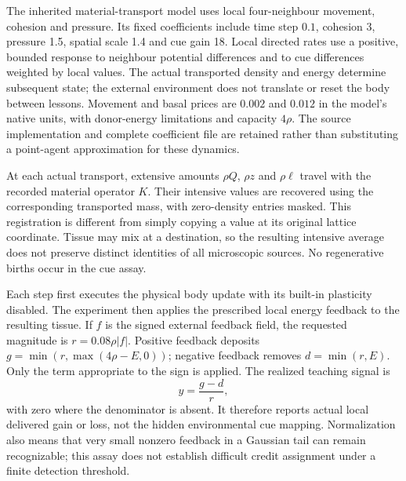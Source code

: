 The inherited material-transport model uses local four-neighbour movement, cohesion and pressure. Its fixed coefficients include time step $0.1$, cohesion 3, pressure 1.5, spatial scale 1.4 and cue gain 18. Local directed rates use a positive, bounded response to neighbour potential differences and to cue differences weighted by local values. The actual transported density and energy determine subsequent state; the external environment does not translate or reset the body between lessons. Movement and basal prices are $0.002$ and $0.012$ in the model's native units, with donor-energy limitations and capacity $4\rho$. The source implementation and complete coefficient file are retained rather than substituting a point-agent approximation for these dynamics.

At each actual transport, extensive amounts $\rho Q$, $\rho z$ and $\rho\ell$ travel with the recorded material operator $K$. Their intensive values are recovered using the corresponding transported mass, with zero-density entries masked. This registration is different from simply copying a value at its original lattice coordinate. Tissue may mix at a destination, so the resulting intensive average does not preserve distinct identities of all microscopic sources. No regenerative births occur in the cue assay.

Each step first executes the physical body update with its built-in plasticity disabled. The experiment then applies the prescribed local energy feedback to the resulting tissue. If $f$ is the signed external feedback field, the requested magnitude is $r=0.08\rho|f|$. Positive feedback deposits $g=\min(r,\max(4\rho-E,0))$; negative feedback removes $d=\min(r,E)$. Only the term appropriate to the sign is applied. The realized teaching signal is
\begin{equation}
y=\frac{g-d}{r},
\end{equation}
with zero where the denominator is absent. It therefore reports actual local delivered gain or loss, not the hidden environmental cue mapping. Normalization also means that very small nonzero feedback in a Gaussian tail can remain recognizable; this assay does not establish difficult credit assignment under a finite detection threshold.

